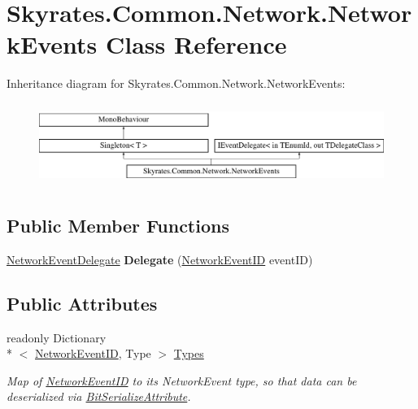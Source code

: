 \hypertarget{class_skyrates_1_1_common_1_1_network_1_1_network_events}{\section{Skyrates.\-Common.\-Network.\-Network\-Events Class Reference}
\label{class_skyrates_1_1_common_1_1_network_1_1_network_events}
}
Inheritance diagram for Skyrates.\-Common.\-Network.\-Network\-Events\-:\begin{figure}[H]
\begin{center}
\leavevmode
\includegraphics[height=2.700965cm]{class_skyrates_1_1_common_1_1_network_1_1_network_events}
\end{center}
\end{figure}
\subsection*{Public Member Functions}
\begin{DoxyCompactItemize}
\item 
\hypertarget{class_skyrates_1_1_common_1_1_network_1_1_network_events_a8113fa3394ce40bd2caf8071863a3679}{\hyperlink{namespace_skyrates_1_1_common_1_1_network_a87882c06bd9c9c4138d4e098242f7b67}{Network\-Event\-Delegate} {\bfseries Delegate} (\hyperlink{namespace_skyrates_1_1_common_1_1_network_a90fc6faa44c44b4284114e861d3e761a}{Network\-Event\-I\-D} event\-I\-D)}\label{class_skyrates_1_1_common_1_1_network_1_1_network_events_a8113fa3394ce40bd2caf8071863a3679}

\end{DoxyCompactItemize}
\subsection*{Public Attributes}
\begin{DoxyCompactItemize}
\item 
readonly Dictionary\\*
$<$ \hyperlink{namespace_skyrates_1_1_common_1_1_network_a90fc6faa44c44b4284114e861d3e761a}{Network\-Event\-I\-D}, Type $>$ \hyperlink{class_skyrates_1_1_common_1_1_network_1_1_network_events_a9360ac6e13813aa04c2f77c18fea5274}{Types}
\begin{DoxyCompactList}\small\item\em Map of \hyperlink{namespace_skyrates_1_1_common_1_1_network_a90fc6faa44c44b4284114e861d3e761a}{Network\-Event\-I\-D} to its Network\-Event type, so that data can be deserialized via \hyperlink{class_skyrates_1_1_common_1_1_network_1_1_bit_serialize_attribute}{Bit\-Serialize\-Attribute}. \end{DoxyCompactList}\end{DoxyCompactItemize}
